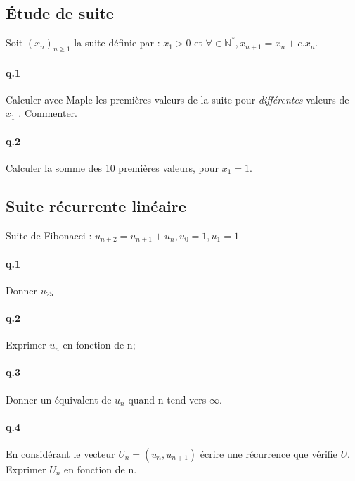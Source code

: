\documentclass[10pt,a4paper]{article}
\begin{document}
\subsection{Étude de suite}
Soit $(x_n)_{n\geq1}$ la suite définie par : $x_1 > 0$ et $\forall \in \mathbb{N}^*, x_{n+1} = x_n + e.x_n$.
\paragraph{q.1} Calculer avec Maple les premières valeurs de la suite pour \emph{différentes} valeurs de $x_1$ . Commenter.

\paragraph{q.2} Calculer la somme des 10 premières valeurs, pour $x_1=1$.

\subsection{Suite récurrente linéaire}
Suite de Fibonacci : $u_{n+2}=u_{n+1}+u_{n}, u_0=1, u_1=1$
\paragraph{q.1} Donner $u_{25}$ 
\paragraph{q.2} Exprimer $u_n$ en fonction de n;
\paragraph{q.3} Donner un équivalent de $u_n$ quand n tend vers $\infty$.
\paragraph{q.4} En considérant le vecteur $U_n=(u_n,u_{n+1})$ écrire une
récurrence que vérifie $U$. Exprimer $U_n$ en fonction de n.
\end{document}
